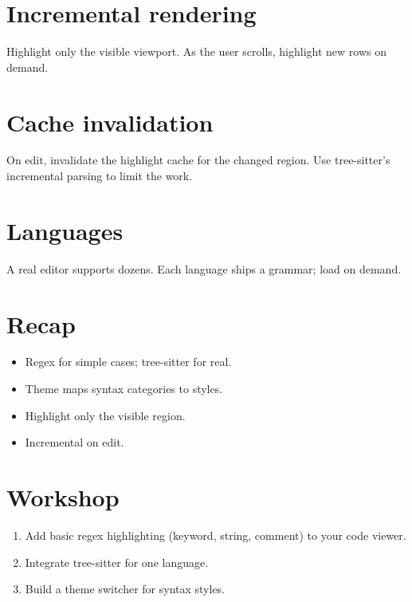 \section{Incremental rendering}

Highlight only the visible viewport. As the user scrolls,
highlight new rows on demand.

\section{Cache invalidation}

On edit, invalidate the highlight cache for the changed
region. Use tree-sitter's incremental parsing to limit
the work.

\section{Languages}

A real editor supports dozens. Each language ships a
grammar; load on demand.

\section{Recap}

\begin{recap}
\begin{itemize}[leftmargin=*]
  \item Regex for simple cases; tree-sitter for real.
  \item Theme maps syntax categories to styles.
  \item Highlight only the visible region.
  \item Incremental on edit.
\end{itemize}
\end{recap}

\section*{Workshop}

\begin{enumerate}[leftmargin=*]
  \item Add basic regex highlighting (keyword, string,
    comment) to your code viewer.
  \item Integrate tree-sitter for one language.
  \item Build a theme switcher for syntax styles.
\end{enumerate}
